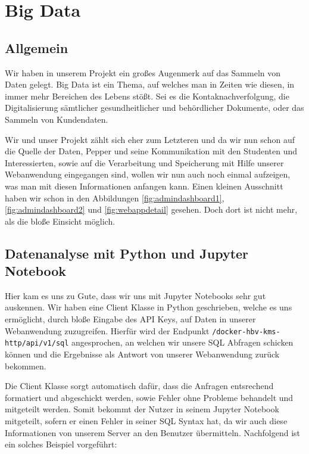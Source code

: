 \newcommand{\bigdatachapter}{Kapitel 9. }
\chapter{Big Data}
\label{chapter:big-data}
\lhead{\bigdatachapter \emph{Big Data}}

\section{Allgemein}
Wir haben in unserem Projekt ein großes Augenmerk auf das Sammeln von Daten gelegt. Big Data ist ein Thema, auf welches man in Zeiten wie diesen, in immer mehr Bereichen des Lebens stößt. Sei es die Kontaknachverfolgung, die Digitalisierung sämtlicher gesundheitlicher und behördlicher Dokumente, oder das Sammeln von Kundendaten.

Wir und unser Projekt zählt sich eher zum Letzteren und da wir nun schon auf die Quelle der Daten, Pepper und seine Kommunikation mit den Studenten und Interessierten, sowie auf die Verarbeitung und Speicherung mit Hilfe unserer Webanwendung eingegangen sind, wollen wir nun auch noch einmal aufzeigen, was man mit diesen Informationen anfangen kann. Einen kleinen Ausschnitt haben wir schon in den Abbildungen \ref{fig:admindashboard1}, \ref{fig:admindashboard2} und \ref{fig:webappdetail} gesehen. Doch dort ist nicht mehr, als die bloße Einsicht möglich.\\

\section{Datenanalyse mit Python und Jupyter Notebook}
Hier kam es uns zu Gute, dass wir uns mit Jupyter Notebooks sehr gut auskennen. Wir haben eine Client Klasse in Python geschrieben, welche es uns ermöglicht, durch bloße Eingabe des API Keys, auf Daten in unserer Webanwendung zuzugreifen. Hierfür wird der Endpunkt \verb|/docker-hbv-kms-http/api/v1/sql| angesprochen, an welchen wir unsere SQL Abfragen schicken können und die Ergebnisse als Antwort von unserer Webanwendung zurück bekommen.

Die Client Klasse sorgt automatisch dafür, dass die Anfragen entsrechend formatiert und abgeschickt werden, sowie Fehler ohne Probleme behandelt und mitgeteilt werden. Somit bekommt der Nutzer in seinem Jupyter Notebook mitgeteilt, sofern er einen Fehler in seiner SQL Syntax hat, da wir auch diese Informationen von unserem Server an den Benutzer übermitteln. Nachfolgend ist ein solches Beispiel vorgeführt:
\newpage

